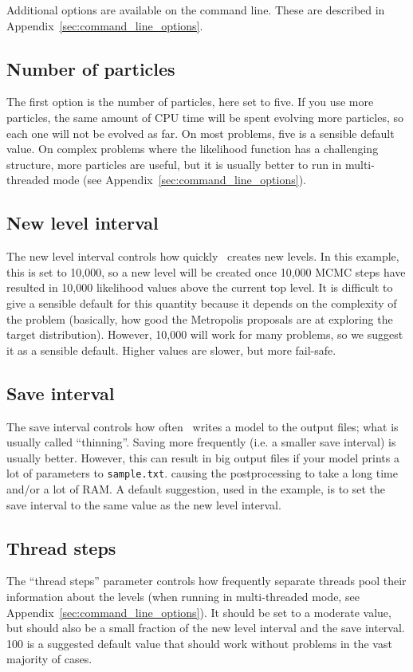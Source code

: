 \documentclass[article]{jss}
\newcommand{\dnest}{\pkg{DNest4}}
\begin{document}
Additional options are available on the command line. These are
described in Appendix~\ref{sec:command_line_options}.

\subsection{Number of particles}
The first option is the number of particles, here set to five.
If you use more particles, the same amount of CPU time will be spent evolving more particles,
so each one will not be evolved as far. On most problems, five is a sensible
default value. On complex problems where the likelihood function has
a challenging structure, more particles are useful, but it is usually better
to run in multi-threaded mode (see Appendix~\ref{sec:command_line_options}).

\subsection{New level interval}
The new level interval controls how quickly \dnest~creates new levels. In this
example, this is set to 10,000, so a new level will be created once 10,000
MCMC steps have resulted in
10,000 likelihood values above the current top level.
It is difficult to give a sensible default for this
quantity because it depends on the complexity of the problem (basically,
how good the Metropolis proposals are at exploring the target distribution).
However, 10,000 will work for many problems, so we suggest it as a sensible
default. Higher values are slower, but more fail-safe.

\subsection{Save interval}
The save interval controls how often \dnest~writes a model to the output
files; what is usually called ``thinning''. Saving more frequently
(i.e. a smaller save interval) is usually better. However, this can result
in
big output files if your model prints a lot of parameters to {\tt sample.txt}.
causing the postprocessing to take a long time and/or a lot of RAM.
A default suggestion, used in the example, is to set the save interval to the
same value as the new level interval.

\subsection{Thread steps}
The ``thread steps'' parameter controls how frequently separate threads pool
their information about the levels (when running in multi-threaded mode,
see Appendix~\ref{sec:command_line_options}). It should be set to a moderate
value, but should also be a small fraction of the new level interval and the
save interval. 100 is a suggested default value that should work without
problems in the vast majority of cases.
\end{document}

